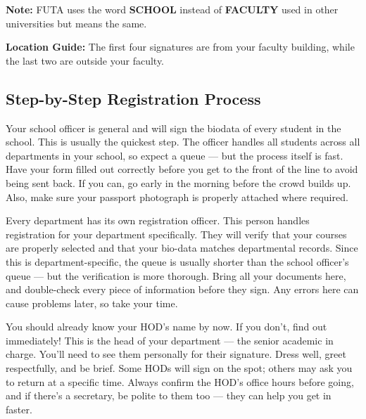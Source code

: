 \documentclass[11pt,a4paper]{article}
\begin{document}
\item \textbf{Note:} FUTA uses the word \textbf{SCHOOL} instead of \textbf{FACULTY} used in other universities but means the same.

\textbf{Location Guide:} The first four signatures are from your faculty building, while the last two are outside your faculty.

\subsection{Step-by-Step Registration Process}

\begin{tcolorbox}[colback=lightGray,colframe=primary,title={\color{white}\textbf{Step 1: School Officer}},colbacktitle=primary,arc=4pt,breakable]
Your school officer is general and will sign the biodata of every student in the school. This is usually the quickest step. The officer handles all students across all departments in your school, so expect a queue --- but the process itself is fast. Have your form filled out correctly before you get to the front of the line to avoid being sent back. If you can, go early in the morning before the crowd builds up. Also, make sure your passport photograph is properly attached where required.
\end{tcolorbox}

\begin{tcolorbox}[colback=lightGray,colframe=primary,title={\color{white}\textbf{Step 2: Registration Officer}},colbacktitle=primary,arc=4pt,breakable]
Every department has its own registration officer. This person handles registration for your department specifically. They will verify that your courses are properly selected and that your bio-data matches departmental records. Since this is department-specific, the queue is usually shorter than the school officer's queue --- but the verification is more thorough. Bring all your documents here, and double-check every piece of information before they sign. Any errors here can cause problems later, so take your time.
\end{tcolorbox}

\begin{tcolorbox}[colback=lightGray,colframe=primary,title={\color{white}\textbf{Step 3: Head of Department (HOD)}},colbacktitle=primary,arc=4pt,breakable]
You should already know your HOD's name by now. If you don't, find out immediately! This is the head of your department --- the senior academic in charge. You'll need to see them personally for their signature. Dress well, greet respectfully, and be brief. Some HODs will sign on the spot; others may ask you to return at a specific time. Always confirm the HOD's office hours before going, and if there's a secretary, be polite to them too --- they can help you get in faster.
\end{tcolorbox}
\end{document}
